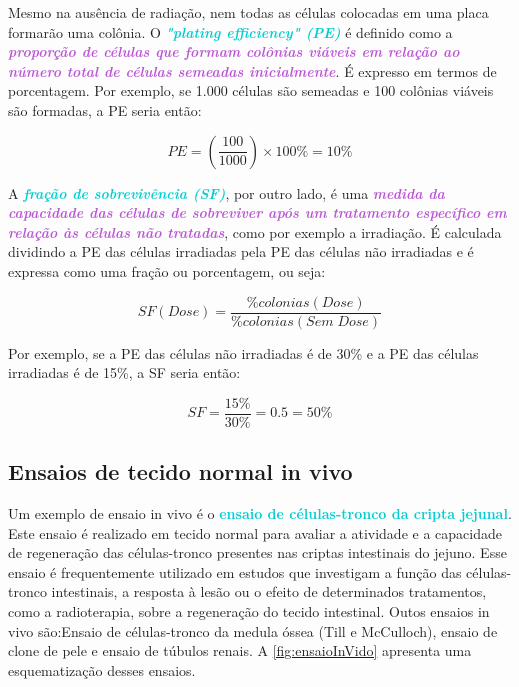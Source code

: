\documentclass[11pt,a4paper]{article}
\newcounter{exemplo}
\begin{document}
	Mesmo na ausência de radiação, nem todas as células colocadas em uma placa formarão uma colônia. O \textcolor{DarkTurquoise}{\textbf{\textit{"plating efficiency" (PE)}}} é definido como a \textcolor{MediumOrchid}{\textbf{\textit{proporção de células que formam colônias viáveis em relação ao número total de células semeadas inicialmente}}}. É expresso em termos de porcentagem. Por exemplo, se 1.000 células são semeadas e 100 colônias viáveis são formadas, a PE seria então:
	
		$$PE = \left(\frac{100}{1000}\right) \times 100\% = 10\%$$
	

	A \textcolor{DarkTurquoise}{\textbf{\textit{fração de sobrevivência (SF)}}}, por outro lado, é uma \textcolor{MediumOrchid}{\textbf{\textit{medida da capacidade das células de sobreviver após um tratamento específico em relação às células não tratadas}}}, como por exemplo a irradiação. É calculada dividindo a PE das células irradiadas pela PE das células não irradiadas e é expressa como uma fração ou porcentagem, ou seja:
	
		$$SF(Dose) = \frac{\%colonias (Dose)}{\%colonias (Sem \; Dose)}$$
	
	Por exemplo, se a PE das células não irradiadas é de 30\% e a PE das células irradiadas é de 15\%, a SF seria então:

		$$SF = \frac{15\%}{30\%} = 0.5 = 50\%$$
	

\subsection*{Ensaios de tecido normal in vivo}

	Um exemplo de ensaio in vivo é o \textcolor{DarkTurquoise}{\textbf{ensaio de células-tronco da cripta jejunal}}. Este ensaio é realizado em tecido normal para avaliar a atividade e a capacidade de regeneração das células-tronco presentes nas criptas intestinais do jejuno. Esse ensaio é frequentemente utilizado em estudos que investigam a função das células-tronco intestinais, a resposta à lesão ou o efeito de determinados tratamentos, como a radioterapia, sobre a regeneração do tecido intestinal. Outos ensaios in vivo são:Ensaio de células-tronco da medula óssea (Till e McCulloch), ensaio de clone de pele e ensaio de túbulos renais. A \ref{fig:ensaioInVido} apresenta uma esquematização desses ensaios.
\end{document}

